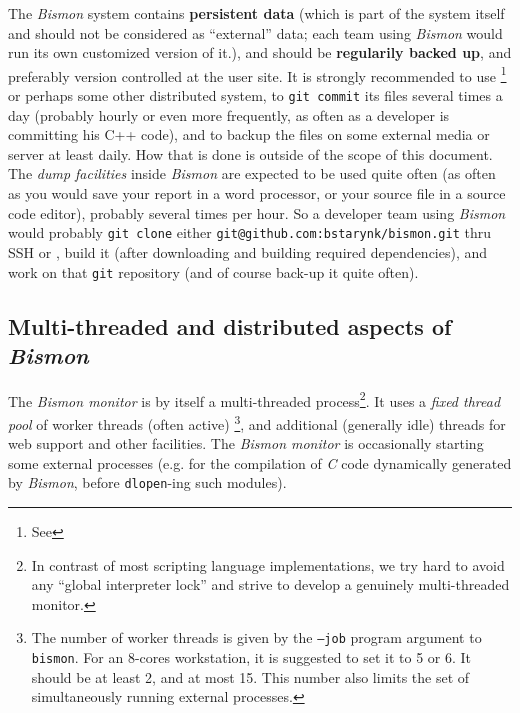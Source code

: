 The \textit{Bismon} system contains \textbf{persistent data} (which is
part of the system itself and should not be considered as ``external''
data; each team using \textit{Bismon} would run its own customized
version of it.), and should be \textbf{regularily backed up}, and
preferably version controlled at the user site. It is strongly
recommended to use  \footnote{See
  } or perhaps some other distributed
 system, to \texttt{git
  commit} its files several times a day (probably hourly or even more
frequently, as often as a developer is committing his C++ code), and
to backup the files on some external media or server at least
daily. How that is done is outside of the scope of this document. The
\emph{dump facilities} inside \textit{Bismon} are expected to be used
quite often (as often as you would save your report in a word
processor, or your source file in a source code editor), probably
several times per hour. So a developer team using \textit{Bismon}
would probably \texttt{git clone} either
\texttt{git@github.com:bstarynk/bismon.git} thru SSH or
, build it (after
downloading and building required dependencies), and work on that
\texttt{git} repository (and of course back-up it quite often).


\subsection{Multi-threaded and distributed aspects of \textit{Bismon}}

The \textit{Bismon monitor} is by itself a multi-threaded
process\footnote{In contrast of most scripting language
  implementations, we try hard to avoid any ``global interpreter
  lock'' and strive to develop a genuinely multi-threaded monitor.}.
It uses a \emph{fixed thread pool} of worker threads (often active)
\footnote{The number of worker threads is given by the \texttt{--job}
  program argument to \texttt{bismon}. For an 8-cores workstation, it
  is suggested to set it to 5 or 6. It should be at least 2, and at
  most 15. This number also limits the set of simultaneously running
  external processes.}, and additional (generally idle) threads for
web support and other facilities. The \textit{Bismon monitor} is
occasionally starting some external processes (e.g. for the
compilation of \emph{C} code dynamically generated by \textit{Bismon},
before \texttt{dlopen}-ing such modules).

%

